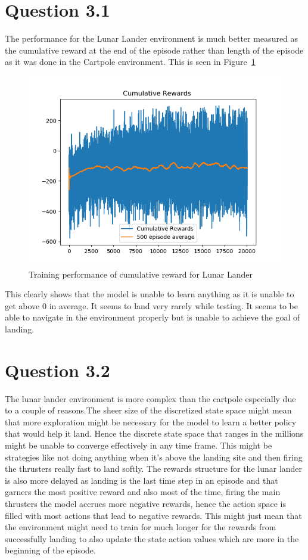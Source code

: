 \documentclass[a4paper]{article}
\begin{document}
\section*{Question 3.1}
The performance for the Lunar Lander environment is much better measured as the cumulative reward at the end of the episode rather than length of the episode as it was done in the Cartpole environment. This is seen in Figure~\ref{fig-Lunar}
\begin{figure}[h!]
    \centering
    \includegraphics[width=\textwidth]{Lunar_rewards.png}
    \caption{Training performance of cumulative reward for Lunar Lander}
    \label{fig-Lunar}
\end{figure}
This clearly shows that the model is unable to learn anything as it is unable to get above 0 in average. It seems to land very rarely while testing. It seems to be able to navigate in the environment properly but is unable to achieve the goal of landing.
\section*{Question 3.2}
The lunar lander environment is more complex than the cartpole especially due to a couple of reasons.The sheer size of the discretized state space might mean that more exploration might be necessary for the model to learn a better policy that would help it land. Hence the discrete state space that ranges in the millions might be unable to converge effectively in any time frame. This might be strategies like not doing anything when it's above the landing site and then firing the thrusters really fast to land softly. The rewards structure for the lunar lander is also more delayed as landing is the last time step in an episode and that garners the most positive reward and also most of the time, firing the main thrusters the model accrues more negative rewards, hence the action space is filled with most actions that lead to negative rewards. This might just mean that the environment might need to train for much longer for the rewards from successfully landing to also update the state action values which are more in the beginning of the episode.  
\end{document}
